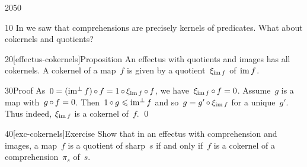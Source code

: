 \begin{parsec}{2050}%
\begin{point}{10}%
In  we saw that comprehensions
    are precisely kernels of predicates.
What about cokernels and quotients?
\end{point}
\begin{point}{20}[effectus-cokernels]{Proposition}%
An effectus with quotients and images has all cokernels.
A cokernel of a map~$f$
    is given by a quotient~$\xi_{\operatorname{im} f}$ of~$\operatorname{im} f$.
\begin{point}{30}{Proof}%
As~$0 = (\operatorname{im^\perp} f) \mathop{\circ} f = 1 \mathop{\circ} \xi_{\operatorname{im} f} \mathop{\circ} f$,
        we have~$\xi_{\operatorname{im} f} \mathop{\circ} f = 0$.
    Assume~$g$ is a map with~$g \mathop{\circ} f = 0$.
Then~$1 \mathop{\circ} g \leqslant \operatorname{im^\perp} f$
    and so~$g = g' \mathop{\circ} \xi_{\operatorname{im} f}$
    for a unique~$g'$.
Thus indeed, $\xi_{\operatorname{im} f}$ is a cokernel of~$f$. \qed
\end{point}
\end{point}
\begin{point}{40}[exc-cokernels]{Exercise}%
Show that in an effectus with comprehension and images,
    a map~$f$ is a quotient of sharp~$s$
    if and only if~$f$ is a cokernel
    of a comprehension~$\pi_s$ of~$s$.
\end{point}
\end{parsec}

